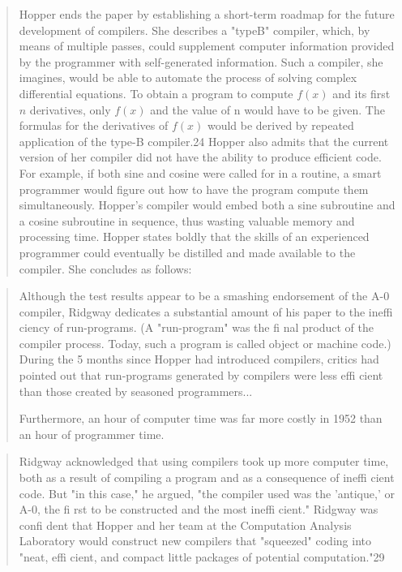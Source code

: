 \begin{quotation}
Hopper ends the paper by establishing a short-term roadmap
for the future development of compilers. She describes a "typeB" compiler, which, by means of multiple passes, could supplement computer information provided by the programmer with
self-generated information. Such a compiler, she imagines, would
be able to automate the process of solving complex differential
equations. To obtain a program to compute $f(x)$ and its first $n$
derivatives, only $f(x)$ and the value of n would have to be given.
The formulas for the derivatives of $f(x)$ would be derived by
repeated application of the type-B compiler.24
Hopper also admits that the current version of her compiler
did not have the ability to produce efficient code. 
For example, if both sine and cosine were called for in a routine, 
a smart programmer would figure out how to have the program 
compute them simultaneously. Hopper's compiler would embed both
a sine subroutine and a cosine subroutine in sequence, thus
wasting valuable memory and processing time. Hopper states
boldly that the skills of an experienced programmer could eventually be distilled and made available to the compiler. She concludes as follows:
\end{quotation}

\begin{quotation}
Although the test results appear to be a smashing endorsement
of the A-0 compiler, Ridgway dedicates a substantial amount of
his paper to the ineffi ciency of run-programs. (A "run-program"
was the fi nal product of the compiler process. Today, such a
program is called object or machine code.) During the 5 months
since Hopper had introduced compilers, critics had pointed out
that run-programs generated by compilers were less effi cient than
those created by seasoned programmers... 

Furthermore, an hour of computer time was far more costly in 1952 than an hour of programmer time. 
\end{quotation}

\begin{quotation}
Ridgway acknowledged that using compilers took up more
computer time, both as a result of compiling a program and as
a consequence of ineffi cient code. But "in this case," he argued,
"the compiler used was the 'antique,' or A-0, the fi rst to be
constructed and the most ineffi cient." Ridgway was confi dent
that Hopper and her team at the Computation Analysis Laboratory would construct new compilers that "squeezed" coding
into "neat, effi cient, and compact little packages of potential
computation."29
\end{quotation}

